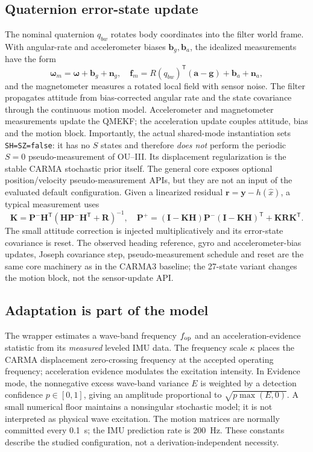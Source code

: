\documentclass[conference]{IEEEtran}
\newcommand{\vct}[1]{\bm{#1}}
\newcommand{\mat}[1]{\bm{#1}}
\newcommand{\T}{^{\mathsf T}}
\begin{document}
\subsection{Quaternion error-state update}
The nominal quaternion $q_{bw}$ rotates body coordinates into the filter
world frame. With angular-rate and accelerometer biases $\vct b_g,\vct b_a$,
the idealized measurements have the form
\begin{equation}
 \vct\omega_m=\vct\omega+\vct b_g+\vct n_g,\quad
 \vct f_m=R(q_{bw})\T(\vct a-\vct g)+\vct b_a+\vct n_a,
 \label{eq:imu}
\end{equation}
and the magnetometer measures a rotated local field with sensor noise.
The filter propagates attitude from bias-corrected angular rate and the
state covariance through the continuous motion model. Accelerometer and
magnetometer measurements update the QMEKF; the acceleration update
couples attitude, bias and the motion block. Importantly, the actual
shared-mode instantiation sets \texttt{SH=SZ=false}: it has no $S$ states
and therefore \emph{does not} perform the periodic $S=0$
pseudo-measurement of OU--III. Its displacement regularization is the
stable CARMA stochastic prior itself. The general core exposes optional
position/velocity pseudo-measurement APIs, but they are not an input of
the evaluated default configuration.
Given a linearized residual $\vct r=\vct y-h(\hat x)$, a typical
measurement uses
\begin{equation}
 \mat K=\mat P^-\mat H\T(\mat H\mat P^-\mat H\T+
 \mat R)^{-1},\quad
 \mat P^+=(\mat I-\mat K\mat H)\mat P^-
 (\mat I-\mat K\mat H)\T+\mat K\mat R\mat K\T.
 \label{eq:joseph}
\end{equation}
The small attitude correction is injected multiplicatively and its
error-state covariance is reset. The observed heading reference, gyro and
accelerometer-bias updates, Joseph covariance step, pseudo-measurement
schedule and reset are the same core machinery as in the CARMA3 baseline;
the 27-state variant changes the motion block, not the sensor-update API.

\subsection{Adaptation is part of the model}
The wrapper estimates a wave-band frequency $f_{\rm op}$ and an
acceleration-evidence statistic from its \emph{measured} leveled IMU data.
The frequency scale $\kappa$ places the CARMA displacement zero-crossing
frequency at the accepted operating frequency; acceleration evidence
modulates the excitation intensity. In Evidence mode, the nonnegative
excess wave-band variance $E$ is weighted by a detection confidence
$p\in[0,1]$, giving an amplitude proportional to
$\sqrt{p\max(E,0)}$. A small numerical floor maintains a nonsingular
stochastic model; it is not interpreted as physical wave excitation.
The motion matrices are normally committed every \SI{0.1}{s}; the IMU
prediction rate is \SI{200}{Hz}. These constants describe the studied
configuration, not a derivation-independent necessity.
\end{document}
